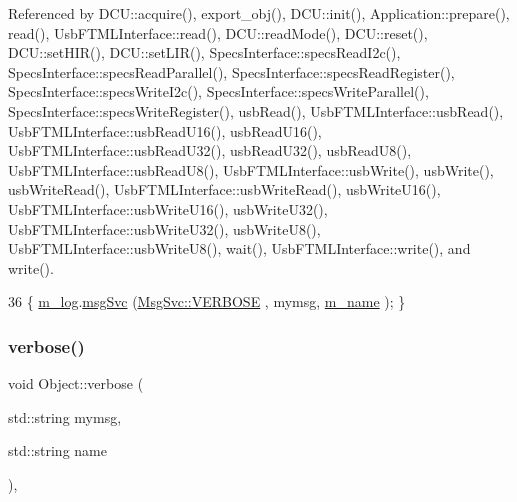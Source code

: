 Referenced by D\+C\+U\+::acquire(), export\+\_\+obj(), D\+C\+U\+::init(), Application\+::prepare(), read(), Usb\+F\+T\+M\+L\+Interface\+::read(), D\+C\+U\+::read\+Mode(), D\+C\+U\+::reset(), D\+C\+U\+::set\+H\+I\+R(), D\+C\+U\+::set\+L\+I\+R(), Specs\+Interface\+::specs\+Read\+I2c(), Specs\+Interface\+::specs\+Read\+Parallel(), Specs\+Interface\+::specs\+Read\+Register(), Specs\+Interface\+::specs\+Write\+I2c(), Specs\+Interface\+::specs\+Write\+Parallel(), Specs\+Interface\+::specs\+Write\+Register(), usb\+Read(), Usb\+F\+T\+M\+L\+Interface\+::usb\+Read(), Usb\+F\+T\+M\+L\+Interface\+::usb\+Read\+U16(), usb\+Read\+U16(), Usb\+F\+T\+M\+L\+Interface\+::usb\+Read\+U32(), usb\+Read\+U32(), usb\+Read\+U8(), Usb\+F\+T\+M\+L\+Interface\+::usb\+Read\+U8(), Usb\+F\+T\+M\+L\+Interface\+::usb\+Write(), usb\+Write(), usb\+Write\+Read(), Usb\+F\+T\+M\+L\+Interface\+::usb\+Write\+Read(), usb\+Write\+U16(), Usb\+F\+T\+M\+L\+Interface\+::usb\+Write\+U16(), usb\+Write\+U32(), Usb\+F\+T\+M\+L\+Interface\+::usb\+Write\+U32(), usb\+Write\+U8(), Usb\+F\+T\+M\+L\+Interface\+::usb\+Write\+U8(), wait(), Usb\+F\+T\+M\+L\+Interface\+::write(), and write().


\begin{DoxyCode}
36 \{ \hyperlink{classObject_a0d269813dd7ac1f24bc143031e2963f2}{m\_log}.\hyperlink{classMsgSvc_ad25f18047920cc59a314e5098259711c}{msgSvc} (\hyperlink{classMsgSvc_ae671eb7301996cd049d2da8a65925926af655256b06494ade5ba830abe5401ec9}{MsgSvc::VERBOSE} , mymsg, \hyperlink{classObject_a8b83c95c705d2c3ba0d081fe1710f48d}{m\_name} ); \}
\end{DoxyCode}
\mbox{\label{classObject_a2d4120195317e2a3c6532e8bb9f3da68}} 
\subsubsection{\texorpdfstring{verbose()}{verbose()}\hspace{0.1cm}{\footnotesize\ttfamily [2/2]}}
{\footnotesize\ttfamily void Object\+::verbose (\begin{DoxyParamCaption}\item[{std\+::string}]{mymsg,  }\item[{std\+::string}]{name }\end{DoxyParamCaption})\hspace{0.3cm}{\ttfamily [inline]}, {\ttfamily [inherited]}}



